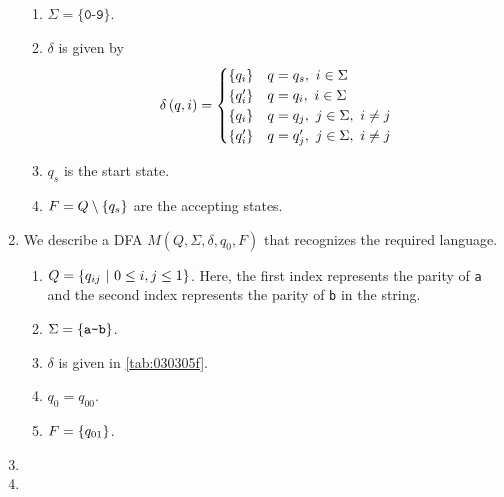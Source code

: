 \begin{solution}
\begin{enumerate}[label=\alph*)]
\begin{enumerate}[label=\roman*)]
            \item $\Sigma = \{\texttt{0-9}\}$.
            \item $\delta$ is given by
            \begin{align*}
                \delta\left( q, i \right) = 
                \begin{cases}
                    \left\{ q_i \right\} & q = q_s,\ i \in \Sigma \\
                    \left\{ q_i' \right\} & q = q_i,\ i \in \Sigma \\
                    \left\{ q_i \right\} & q = q_j,\ j \in \Sigma,\ i \neq j \\
                    \left\{ q_i' \right\} & q = q_j',\ j \in \Sigma,\ i \neq j
                \end{cases}
            \end{align*}
            \item $q_s$ is the start state.
            \item $F = Q \setminus \left\{ q_s \right\}$ are the accepting states.
        \end{enumerate}
        \item We describe a DFA $M(Q, \Sigma, \delta, q_0, F)$ that recognizes 
        the required language.
        \begin{enumerate}[label=\roman*)]
            \item $Q = \left\{ q_{ij}\ |\ 0 \le i, j \le 1 \right\}$. Here, the first 
            index represents the parity of \texttt{a} and the second index 
            represents the parity of \texttt{b} in the string.
            \item $\Sigma = \left\{ \texttt{a-b} \right\}$.
            \item $\delta$ is given in \autoref{tab:030305f}.
            
            \item $q_0 = q_{00}$.
            \item $F = \left\{ q_{01} \right\}$.
        \end{enumerate}
        \item 
        \item 
    \end{enumerate}
\end{solution}